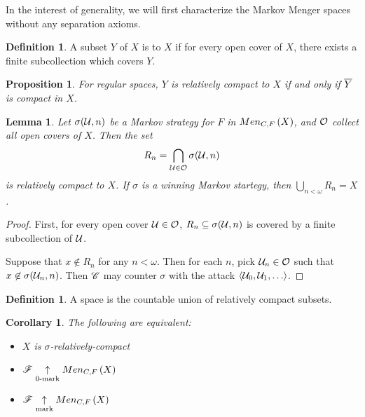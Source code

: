 \documentclass{amsart}
\newtheorem{proposition}[theorem]{Proposition}
\newtheorem{lemma}[theorem]{Lemma}
\newtheorem{corollary}[theorem]{Corollary}
\theoremstyle{definition}
\newtheorem{definition}[theorem]{Definition}
\begin{document}
In the interest of generality, we will first characterize the Markov Menger
spaces without any separation axioms.

\begin{definition}
  A subset \(Y\) of \(X\) is  to \(X\) if for every open
  cover of \(X\), there exists a finite subcollection which covers \(Y\).
\end{definition}

\begin{proposition}
  For regular spaces, \(Y\) is relatively compact to \(X\) if and only if
  \(\overline{Y}\) is compact in \(X\).
\end{proposition}


\begin{lemma}
  Let \(\sigma(\mathcal{U}, n)\) be a Markov strategy for \(F\) in
  \(Men_{C,F}\left({X}\right)\), and \(\mathcal{O}\) collect all open covers of \(X\). Then the
  set
    \[
      R_n = \bigcap_{\mathcal{U}\in\mathcal{O}} \sigma(\mathcal{U},n)
    \]
  is relatively compact to \(X\). If \(\sigma\) is a winning
  Markov startegy, then \(\bigcup_{n<\omega} R_n = X\).
\end{lemma}

\begin{proof}
  First, for every open cover \(\mathcal{U}\in\mathcal{O}\),
  \(R_n\subseteq\sigma(\mathcal{U},n)\) is covered by a finite subcollection of \(\mathcal{U}\).

  Suppose that \(x \not\in R_n\) for any \(n<\omega\). Then for each \(n\),
  pick \(\mathcal{U}_n\in\mathcal{O}\) such that \(x\not\in \sigma(\mathcal{U}_n,n)\). Then
  \(\mathscr{C}\) may counter \(\sigma\) with the attack \(\<\mc U_0,\mc U_1,\dots\>\).
\end{proof}

\begin{definition}
  A  space is the countable union of
  relatively compact subsets.
\end{definition}

\begin{corollary}
  The following are equivalent:
  \begin{itemize}
    \item \(X\) is \(\sigma\)-relatively-compact
    \item \(\mathscr{F} \underset{0\text{-mark}}{\uparrow} Men_{C,F}\left({X}\right)\)
    \item \(\mathscr{F} \underset{\text{mark}}{\uparrow} Men_{C,F}\left({X}\right)\)
  \end{itemize}
\end{corollary}
\end{document}
